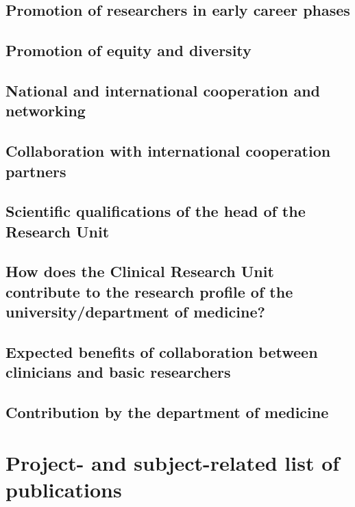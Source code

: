 \documentclass{scrartcl}
\begin{document}
\subsection{Promotion of researchers in early career phases}

\subsection{Promotion of equity and diversity}

\subsection{National and international cooperation and networking}

\subsection{Collaboration with international cooperation partners}


\subsection{Scientific qualifications of the head of the Research Unit}

\subsection{How does the Clinical Research Unit contribute to the research profile of the university/department of medicine?}

\subsection{Expected benefits of collaboration between clinicians and basic researchers}

\subsection{Contribution by the department of medicine}


\section{Project- and subject-related list of publications}
\printbibliography[heading=none]
\end{document}
